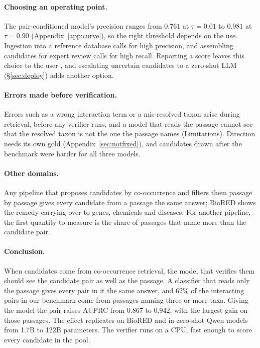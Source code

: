 \documentclass[11pt]{article}
\begin{document}
\paragraph{Choosing an operating point.}\label{sec:opoint}
The pair-conditioned model's precision ranges from $0.761$ at $\tau = 0.01$ to $0.981$ at $\tau = 0.90$ (Appendix~\ref{app:curve}), so the right threshold depends on the use. Ingestion into a reference database calls for high precision, and assembling candidates for expert review calls for high recall. Reporting a score leaves this choice to the user \citep{geifman2017selective}, and escalating uncertain candidates to a zero-shot LLM (\S\ref{sec:deploy}) adds another option.

\paragraph{Errors made before verification.}
Errors such as a wrong interaction term or a mis-resolved taxon arise during retrieval, before any verifier runs, and a model that reads the passage cannot see that the resolved taxon is not the one the passage names
(Limitations). Direction needs its own gold (Appendix~\ref{sec:notfixed}), and candidates drawn
after the benchmark were harder for all three models.

\paragraph{Other domains.}
Any pipeline that proposes candidates by co-occurrence and filters them passage by passage gives
every candidate from a passage the same answer; BioRED shows the remedy carrying over to genes, chemicals and diseases. For another pipeline, the first quantity to measure is the share of passages that name more than the candidate pair.

\paragraph{Conclusion.}
When candidates come from co-occurrence retrieval, the model that verifies them should see the
candidate pair as well as the passage. A classifier that reads only the passage gives every pair in
it the same answer, and 62\% of the interacting pairs in our benchmark come from passages naming
three or more taxa. Giving the model the pair raises AUPRC from $0.867$ to $0.942$, with the largest
gain on those passages. The effect replicates on BioRED and in zero-shot Qwen models from 1.7B to
122B parameters. The verifier runs on a CPU, fast enough to score every candidate in the pool.
\end{document}
